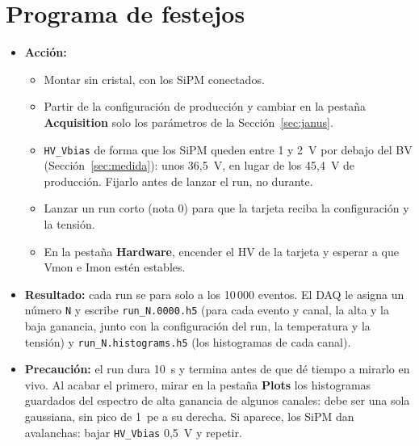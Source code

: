 \documentclass[11pt,a4paper]{article}
\begin{document}
\section*{Programa de festejos}

\begin{itemize}
\item {\bf Acción:}
  \begin{itemize}
  \item Montar sin cristal, con los SiPM conectados.
  \item Partir de la configuración de producción y cambiar en la pestaña
    {\bf Acquisition} solo los parámetros de la Sección~\ref{sec:janus}.
  \item \texttt{HV\_Vbias} de forma que los SiPM queden entre 1 y 2~V por
    debajo del BV (Sección~\ref{sec:medida}): unos 36,5~V, en lugar de los 45,4~V de
    producción. Fijarlo antes de lanzar el run, no durante.
  \item Lanzar un run corto (nota 0) para que la tarjeta reciba la
    configuración y la tensión.
  \item En la pestaña {\bf Hardware}, encender el HV de la tarjeta y esperar
    a que Vmon e Imon estén estables.
  \end{itemize}
\item {\bf Resultado:} cada run se para solo a los 10\,000 eventos. El DAQ
  le asigna un número \texttt{N} y escribe \texttt{run\_N.0000.h5} (para cada
  evento y canal, la alta y la baja ganancia, junto con la configuración del
  run, la temperatura y la tensión) y \texttt{run\_N.histograms.h5} (los
  histogramas de cada canal).
\item {\bf Precaución:} el run dura 10~s y termina antes de que dé tiempo a
  mirarlo en vivo. Al acabar el primero, mirar en la pestaña {\bf Plots}
  los histogramas guardados del espectro de alta ganancia de algunos
  canales: debe ser una sola gaussiana,
  sin pico de 1~pe a su derecha. Si aparece, los SiPM dan
  avalanchas: bajar \texttt{HV\_Vbias} 0,5~V y repetir.
\end{itemize}
\end{document}
